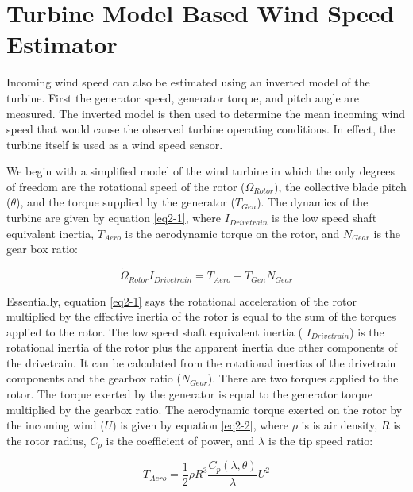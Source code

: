 
\section{Turbine Model Based Wind Speed Estimator} \label{section2-4} 

Incoming wind speed can also be estimated using an inverted model of the turbine.  First the generator speed, generator torque, and pitch angle are measured.  The inverted model is then used to determine the mean incoming wind speed that would cause the observed turbine operating conditions.  In effect, the turbine itself is used as a wind speed sensor. \cite{ostergaard2007,vanderhooft2004,schlipf2014}

We begin with a simplified model of the wind turbine in which the only degrees of freedom are the rotational speed of the rotor ($\Omega _{Rotor}$), the collective blade pitch ($\theta$), and the torque supplied by the generator ($T_{Gen}$).  The dynamics of the turbine are given by equation \ref{eq2-1}, where $I_{Drivetrain}$ is the low speed shaft equivalent inertia, $T_{Aero}$ is the aerodynamic torque on the rotor, and $N_{Gear}$ is the gear box ratio:

\begin{equation}
	\dot{\Omega }_{Rotor}I_{Drivetrain}=T_{Aero}-T_{Gen}N_{Gear} \label{eq2-1}
\end{equation}

Essentially, equation  \ref{eq2-1} says the rotational acceleration of the rotor multiplied by the effective inertia of the rotor is equal to the sum of the torques applied to the rotor. The low speed shaft equivalent inertia ( $I_{Drivetrain}$) is the rotational inertia of the rotor plus the apparent inertia due other components of the drivetrain. It can be calculated from the rotational inertias of the drivetrain components and the gearbox ratio ($N_{Gear}$). There are two torques applied to the rotor. The torque exerted by the generator is equal to the generator torque multiplied by the gearbox ratio. The aerodynamic torque exerted on the rotor by the incoming wind ($U$) is given by equation \ref{eq2-2}, where $\rho$ is is air density, $R$ is the rotor radius, $C_p$ is the coefficient of power, and $\lambda$ is the tip speed ratio:

\begin{equation}
	T_{Aero}=\frac{1}{2}\rho R^{3}\frac{C_{p}(\lambda,\theta)}{\lambda}U^{2} \label{eq2-2}
\end{equation}

